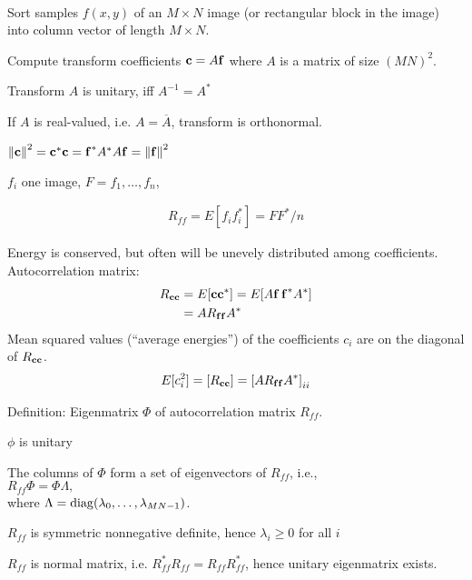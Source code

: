 \begin{compactdesc}
	\item[\lp{General approach}] \hfill\\
		\begin{enumerate*}[label=\protect\circled{\arabic*},itemjoin=]
			\item Sort samples $f(x,y)$ of an $M\times N$ image (or rectangular block in the image) into column vector of length $M\times N$.\\
			\item Compute transform coefficients $\bm{\mathrm{c}}=A\bm{\mathrm{f}}$ where $A$ is a matrix of size $(MN)^2$.\\
			\item Transform $A$ is unitary, iff $A^{-1}=A^{*}$\\
			\item If $A$ is real-valued, i.e. $A=\overline{A}$, transform is orthonormal.\\
		\end{enumerate*}
	\item[\lp{Energy conservation}] $\left\lVert \bm{\mathrm{c}} \right\rVert^2=\bm{\mathrm{c}}^*\bm{\mathrm{c}}=\bm{\mathrm{f}}^*A^*A\bm{\mathrm{f}}=\left\lVert \bm{\mathrm{f}} \right\rVert^2$
	\item[\lp{Image collection}] $f_i$ one image, $F=f_1,\ldots,f_n$,
	\item[\lp{Auto-correltion function}] 
		\begin{gather*}
			R_{ff}=E[f_if_i^*]=FF^*/n
		\end{gather*}
	\item[\lp{energy distribution}] Energy is conserved, but often will be unevely distributed among coefficients. Autocorrelation matrix:
		\begin{align*}
			R_{\bm{\mathrm{c}}\bm{\mathrm{c}}}&=E[\bm{\mathrm{c}}\bm{\mathrm{c}}^*]=E[A\bm{\mathrm{f}}\,\bm{\mathrm{f}}^*A^*]\\
			&=AR_{\bm{\mathrm{f}}\bm{\mathrm{f}}}A^*
		\end{align*}
		Mean squared values (``average energies'') of the coefficients $c_i$ are on the diagonal of $R_{\bm{\mathrm{c}}\bm{\mathrm{c}}}$.
		\begin{gather*}
			E[c_{i}^{2}]=[R_{\bm{\mathrm{c}}\bm{\mathrm{c}}}]=\left[ AR_{\bm{\mathrm{f}}\bm{\mathrm{f}}}A^* \right]_{ii}
		\end{gather*}
	\item[\lp{Eigenmatrix of autocorrelation matrix}] Definition: Eigenmatrix $\Phi$ of autocorrelation matrix $R_{ff}$. \hfill\\
		\begin{enumerate*}[label=\protect\circled{\arabic*},itemjoin=]
			\item $\phi$ is unitary\\
			\item The columns of $\Phi$ form a set of eigenvectors of $R_{ff}$, i.e., \\
					$R_{ff}\Phi=\Phi\Lambda,$\\
				where $\Lambda=\operatorname{diag}(\lambda_0,\ldots,\lambda_{MN-1})$.
			\item $R_{ff}$ is symmetric nonnegative definite, hence $\lambda_i\geq 0$ for all $i$
			\item $R_{ff}$ is normal matrix, i.e. $R_{ff}^*R_{ff}=R_{ff}R_{ff}^{*}$, hence unitary eigenmatrix exists.
		\end{enumerate*}

\end{compactdesc}
